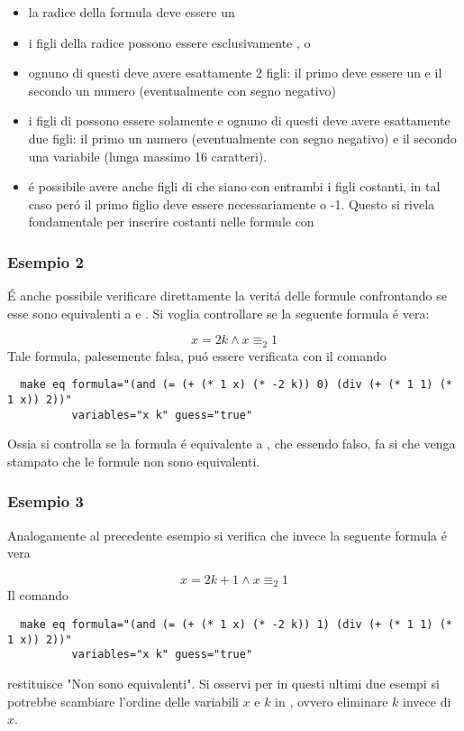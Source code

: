 \documentclass[11pt,letterpaper,twoside]{article}
\begin{document}
\begin{itemize}
\item la radice della formula deve essere un 
\item i figli della radice possono essere esclusivamente \inline{>}, \inline{=} o 
\item ognuno di questi deve avere esattamente 2 figli: il primo deve essere un \inline{+} e
  il secondo un numero (eventualmente con segno negativo)
\item i figli di \inline{+} possono essere solamente \inline{*} e ognuno di questi deve avere
  esattamente due figli: il primo un numero (eventualmente con segno negativo) e il secondo una
  variabile (lunga massimo 16 caratteri).
\item \'e possibile avere anche figli di \inline{+} che siano \inline{*} con
  entrambi i figli costanti, in tal caso per\'o il primo figlio deve essere
  necessariamente  o {-1}. Questo si rivela fondamentale per inserire
  costanti nelle formule con 
\end{itemize}

\subsubsection{Esempio 2}
\'E anche possibile verificare direttamente la verit\'a delle formule
confrontando se esse sono equivalenti a  e .
Si voglia controllare se la seguente formula \'e vera:

$$ x = 2k \land x \equiv_2 1 $$
Tale formula, palesemente falsa, pu\'o essere verificata con il comando

\begin{verbatim}
  make eq formula="(and (= (+ (* 1 x) (* -2 k)) 0) (div (+ (* 1 1) (* 1 x)) 2))"
          variables="x k" guess="true"
\end{verbatim}

Ossia si controlla se la formula \'e equivalente a , che essendo
falso, fa si che venga stampato che le formule non sono equivalenti.

\subsubsection{Esempio 3}
Analogamente al precedente esempio si verifica che invece la seguente formula
\'e vera

$$ x = 2k + 1 \land x \equiv_2 1 $$
Il comando
\begin{verbatim}
  make eq formula="(and (= (+ (* 1 x) (* -2 k)) 1) (div (+ (* 1 1) (* 1 x)) 2))"
          variables="x k" guess="true"
\end{verbatim}
restituisce "Non sono equivalenti".
Si osservi per in questi ultimi due esempi si potrebbe scambiare l'ordine delle
variabili $x$ e $k$ in , ovvero eliminare $k$ invece di $x$.

\newpage
\tableofcontents

\newpage \printbibliography
\end{document}
